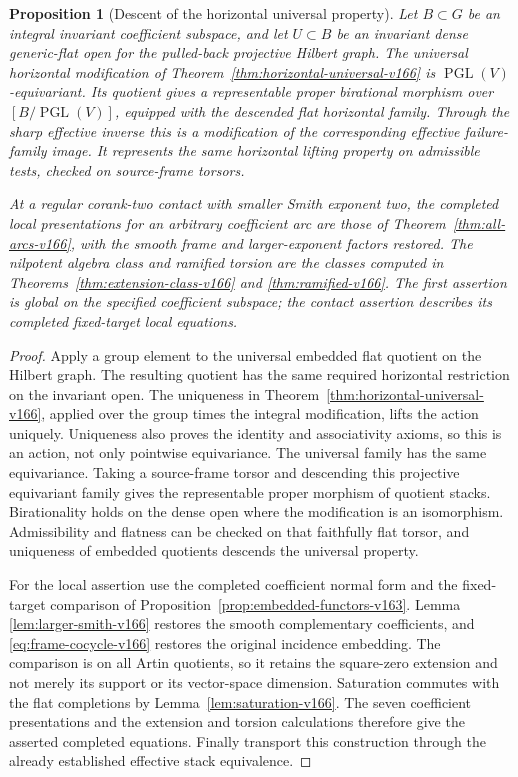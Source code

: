 \documentclass[11pt,reqno]{amsart}
\numberwithin{equation}{section}
\newtheorem{proposition}[theorem]{Proposition}
\theoremstyle{definition}\newtheorem{definition}[theorem]{Definition}
\theoremstyle{remark}\newtheorem{remark}[theorem]{Remark}
\begin{document}
\begin{proposition}[Descent of the horizontal universal property]
\label{prop:effective-horizontal-v166}
Let $B\subset G$ be an integral invariant coefficient subspace,
and let $U\subset B$ be an invariant dense generic-flat open for
the pulled-back projective Hilbert graph. The universal horizontal
modification of Theorem~\ref{thm:horizontal-universal-v166} is
$\operatorname{PGL}(V)$-equivariant. Its quotient gives a
representable proper birational morphism over
$[B/\operatorname{PGL}(V)]$, equipped with the descended flat
horizontal family. Through the sharp effective inverse this is a
modification of the corresponding effective failure-family image.
It represents the same horizontal lifting property on admissible
tests, checked on source-frame torsors.

At a regular corank-two contact with smaller Smith exponent two,
the completed local presentations for an arbitrary coefficient arc
are those of Theorem~\ref{thm:all-arcs-v166}, with the smooth frame
and larger-exponent factors restored. The nilpotent algebra class
and ramified torsion are the classes computed in
Theorems~\ref{thm:extension-class-v166} and
\ref{thm:ramified-v166}. The first assertion is global on the
specified coefficient subspace; the contact assertion describes
its completed fixed-target local equations.
\end{proposition}
\begin{proof}
Apply a group element to the universal embedded flat quotient on
the Hilbert graph. The resulting quotient has the same required
horizontal restriction on the invariant open. The uniqueness in
Theorem~\ref{thm:horizontal-universal-v166}, applied over the group
times the integral modification, lifts the action uniquely.
Uniqueness also proves the identity and associativity axioms, so
this is an action, not only pointwise equivariance. The universal
family has the same equivariance. Taking a source-frame torsor
and descending this projective equivariant family gives the
representable proper morphism of quotient stacks. Birationality
holds on the dense open where the modification is an isomorphism.
Admissibility and flatness can be checked on that faithfully flat
torsor, and uniqueness of embedded quotients descends the universal
property.

For the local assertion use the completed coefficient normal form
and the fixed-target comparison of
Proposition~\ref{prop:embedded-functors-v163}. Lemma
\ref{lem:larger-smith-v166} restores the smooth complementary
coefficients, and \eqref{eq:frame-cocycle-v166} restores the
original incidence embedding. The comparison is on all Artin
quotients, so it retains the square-zero extension and not merely
its support or its vector-space dimension. Saturation commutes
with the flat completions by Lemma~\ref{lem:saturation-v166}.
The seven coefficient presentations and the extension and torsion
calculations therefore give the asserted completed equations.
Finally transport this construction through the already established
effective stack equivalence.
\end{proof}
\end{document}
